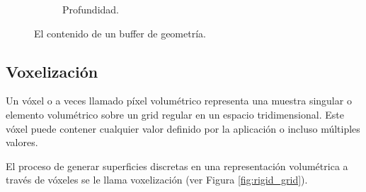 \begin{figure}[H]
\begin{subfigure}[t]{0.32\textwidth}
		\caption*{Profundidad.}
	\end{subfigure}%
	\caption{El contenido de un buffer de geometría.}
	\label{fig:gbuffer}
\end{figure}

\subsection{Voxelización}
\label{sec:voxelization}
Un vóxel o a veces llamado píxel volumétrico representa una muestra singular o elemento volumétrico sobre un grid regular en un espacio tridimensional. Este vóxel puede contener cualquier valor definido por la aplicación o incluso múltiples valores. 

El proceso de generar superficies discretas en una representación volumétrica a través de vóxeles se le llama voxelización (ver Figura \ref{fig:rigid_grid}).


